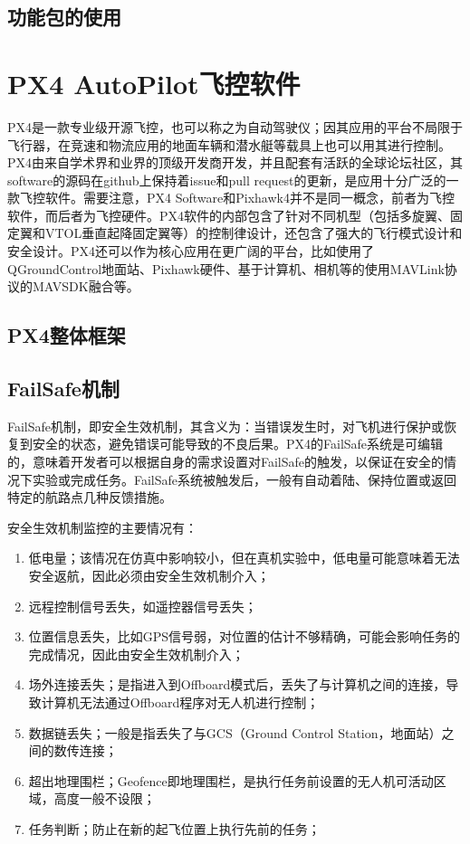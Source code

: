 
\subsection{功能包的使用}

\section{PX4 AutoPilot飞控软件}
PX4是一款专业级开源飞控，也可以称之为自动驾驶仪；因其应用的平台不局限于飞行器，在竞速和物流应用的地面车辆和潜水艇等载具上也可以用其进行控制。PX4由来自学术界和业界的顶级开发商开发，并且配套有活跃的全球论坛社区，其software的源码在github上保持着issue和pull request的更新，是应用十分广泛的一款飞控软件。需要注意，PX4 Software和Pixhawk4并不是同一概念，前者为飞控软件，而后者为飞控硬件。PX4软件的内部包含了针对不同机型（包括多旋翼、固定翼和VTOL垂直起降固定翼等）的控制律设计，还包含了强大的飞行模式设计和安全设计。PX4还可以作为核心应用在更广阔的平台，比如使用了QGroundControl地面站、Pixhawk硬件、基于计算机、相机等的使用MAVLink协议的MAVSDK融合等\cite{meier2015px4}。

\subsection{PX4整体框架}


\subsection{FailSafe机制} \label{2.2.1}
FailSafe机制，即安全生效机制，其含义为：当错误发生时，对飞机进行保护或恢复到安全的状态，避免错误可能导致的不良后果。PX4的FailSafe系统是可编辑的，意味着开发者可以根据自身的需求设置对FailSafe的触发，以保证在安全的情况下实验或完成任务。FailSafe系统被触发后，一般有自动着陆、保持位置或返回特定的航路点几种反馈措施。

安全生效机制监控的主要情况有：
\begin{enumerate}
	\item 低电量；该情况在仿真中影响较小，但在真机实验中，低电量可能意味着无法安全返航，因此必须由安全生效机制介入；
	\item 远程控制信号丢失，如遥控器信号丢失；
	\item 位置信息丢失，比如GPS信号弱，对位置的估计不够精确，可能会影响任务的完成情况，因此由安全生效机制介入；
	\item 场外连接丢失；是指进入到Offboard模式后，丢失了与计算机之间的连接，导致计算机无法通过Offboard程序对无人机进行控制；
	\item 数据链丢失；一般是指丢失了与GCS（Ground Control Station，地面站）之间的数传连接；
	\item 超出地理围栏；Geofence即地理围栏，是执行任务前设置的无人机可活动区域，高度一般不设限；
	\item 任务判断；防止在新的起飞位置上执行先前的任务；
\end{enumerate}

